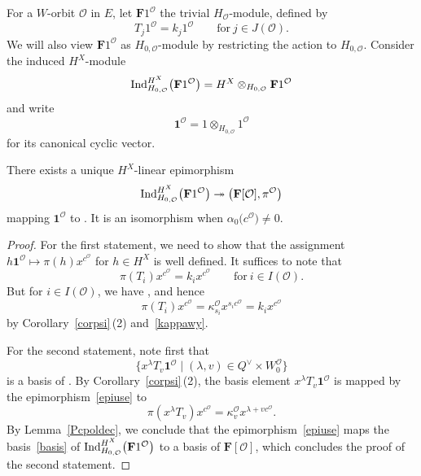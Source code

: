 For a $W$-orbit $\mathcal{O}$ in $E$, let $\mathbf{F}1^\mathcal{O}$
the trivial $H_\mathcal{O}$-module, defined by
\[
T_j1^\mathcal{O}=k_j1^\mathcal{O}\qquad \text{for}\ j\in J(\mathcal{O}).
\]
We will also view $\mathbf{F}1^\mathcal{O}$ as $H_{0,\mathcal{O}}$-module by restricting the action to $H_{0,\mathcal{O}}$.
Consider the induced $H^X$-module
\[
{\rm Ind}_{H_{0,\mathcal{O}}}^{H^X}\bigl(\mathbf{F}1^{\mathcal{O}}\bigr)=H^X\otimes_{H_{0,\mathcal{O}}}\mathbf{F}1^\mathcal{O}
\]
and write
\[
\mathbf{1}^{\mathcal{O}}=1\otimes_{H_{0,\mathcal{O}}}1^\mathcal{O}
\]
for its canonical cyclic vector.

\begin{Proposition}\label{indcor}
There exists a unique $H^X$-linear epimorphism
\begin{equation}\label{epiuse}
{\rm Ind}_{H_{0,\mathcal{O}}}^{H^X}\bigl(\mathbf{F}1^{\mathcal{O}}\bigr)\twoheadrightarrow
\bigl(\mathbf{F}[\mathcal{O}],\pi^\mathcal{O}\bigr)
\end{equation}
mapping $\mathbf{1}^{\mathcal{O}}$ to . It is an isomorphism when $\alpha_0\bigl(c^\mathcal{O}\bigr)\not=0$.
\end{Proposition}

\begin{proof}
For the first statement, we need to show that the assignment $h\mathbf{1}^{\mathcal{O}}\mapsto\pi(h)x^{c^\mathcal{O}}$ for $h\in H^X$ is well defined. It suffices to note that
\[
\pi(T_i)x^{c^\mathcal{O}}=k_ix^{c^\mathcal{O}}\qquad \text{for}\ i\in I(\mathcal{O}).
\]
But for $i\in I(\mathcal{O})$, we have , and hence
\[
\pi(T_i)x^{c^\mathcal{O}}=\kappa_{s_i}^\mathcal{O} x^{s_ic^\mathcal{O}}=k_ix^{c^\mathcal{O}}
\]
by Corollary~\ref{corpsi}\,(2) and~\eqref{kappawy}.

For the second statement, note first that
\begin{equation}\label{basis}
\bigl\{x^\lambda T_v\mathbf{1}^{\mathcal{O}}\mid (\lambda,v)\in Q^\vee\times W_0^\mathcal{O}\bigr\}
\end{equation}
is a basis of . By Corollary~\ref{corpsi}\,(2), the basis element $x^\lambda T_v\mathbf{1}^{\mathcal{O}}$
is mapped by the epimorphism~\eqref{epiuse} to
\[
\pi(x^\lambda T_v)x^{c^\mathcal{O}}=\kappa_v^\mathcal{O}x^{\lambda+vc^\mathcal{O}}.
\]
By Lemma~\ref{Pcpoldec}, we conclude that the epimorphism~\eqref{epiuse} maps the basis~\eqref{basis} of
${\rm Ind}_{H_{0,\mathcal{O}}}^{H^X}\bigl(\mathbf{F}1^\mathcal{O}\bigr)$
to a basis of $\mathbf{F}[\mathcal{O}]$, which concludes the proof of the second statement.
\end{proof}

